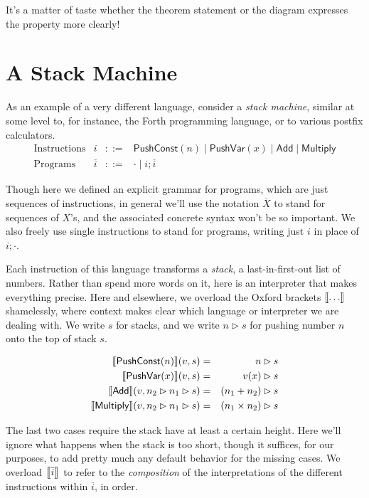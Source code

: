 \documentclass{amsbook}
\theoremstyle{definition}
\theoremstyle{remark}
\numberwithin{section}{chapter}
\numberwithin{equation}{chapter}
\begin{document}
It's a matter of taste whether the theorem statement or the diagram expresses the property more clearly!

\section{A Stack Machine}

As an example of a very different language, consider a \emph{stack machine}, similar at some level to, for instance, the Forth programming language, or to various postfix calculators.
\encoding
$$\begin{array}{rrcl}
  \textrm{Instructions} & i &::=& \mathsf{PushConst}(n) \mid \mathsf{PushVar}(x) \mid \mathsf{Add} \mid \mathsf{Multiply} \\
  \textrm{Programs} & \overline{i} &::=& \cdot \mid i; \overline{i}
\end{array}$$

Though here we defined an explicit grammar for programs, which are just sequences of instructions, in general we'll use the notation $\overline{X}$ to stand for sequences of $X$'s, and the associated concrete syntax won't be so important.
We also freely use single instructions to stand for programs, writing just $i$ in place of $i; \cdot$.

\newcommand{\push}[2]{#1 \rhd #2}

Each instruction of this language transforms a \emph{stack}, a last-in-first-out list of numbers.
Rather than spend more words on it, here is an interpreter that makes everything precise.
Here and elsewhere, we overload the Oxford brackets ${\left \llbracket \ldots \right \rrbracket}$ shamelessly, where context makes clear which language or interpreter we are dealing with.
We write $s$ for stacks, and we write $\push{n}{s}$ for pushing number $n$ onto the top of stack $s$.

\encoding
\begin{eqnarray*}
  \denote{\mathsf{PushConst}(n)}(v,s) &=& \push{n}{s} \\
  \denote{\mathsf{PushVar}(x)}(v,s) &=& \push{\msel{v}{x}}{s} \\
  \denote{\mathsf{Add}}(v,\push{n_2}{\push{n_1}{s}}) &=& \push{(n_1 + n_2)}{s} \\
  \denote{\mathsf{Multiply}}(v,\push{n_2}{\push{n_1}{s}}) &=& \push{(n_1 \times n_2)}{s}
\end{eqnarray*}

The last two cases require the stack have at least a certain height.
Here we'll ignore what happens when the stack is too short, though it suffices, for our purposes, to add pretty much any default behavior for the missing cases.
We overload ${\left \llbracket \overline{i} \right \rrbracket}$ to refer to the \emph{composition} of the interpretations of the different instructions within $\overline{i}$, in order.
\end{document}
